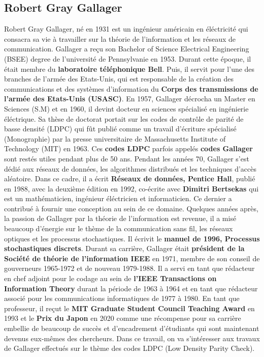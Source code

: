 \documentclass[french,nochapter,11pt]{rapportUB}
\begin{document}
\subsection{Robert Gray Gallager}
Robert Gray Gallager, né en 1931 est un ingénieur américain en éléctricité qui consacra sa vie à travailler sur la théorie de l'information et les réseaux de communication. \newline
Gallager a reçu son Bachelor of Science Electrical Engineering (BSEE) degree de l'université de Pennsylvanie en 1953. Durant cette époque, il était membre du \textbf{laboratoire téléphonique Bell}. Puis, il servit pour l'une des branches de l'armée des Etats-Unis, qui est responsable de la création des communications et des systèmes d'information du \textbf{Corps des transmissions de l'armée des Etats-Unis (USASC)}. En 1957, Gallager décrocha un Master en Sciences (S.M) et en 1960, il devint docteur en sciences spécialisé en ingénierie éléctrique. \newline
Sa thèse de doctorat portait sur les codes de contrôle de parité de basse densité (LDPC) qui fût publié comme un travail d'écriture spécialisé (Monographie) par la presse universitaire de Massachusetts Institute of Technology (MIT) en 1963. Ces \textbf{codes LDPC} parfois appelés \textbf{codes Gallager} sont restés utiles pendant plus de 50 ans. \newline
Pendant les années 70, Gallager s'est dédié aux réseaux de données, les algorithmes distribués et les techniques d'accès aléatoire. Dans ce cadre, il a écrit \textbf{Réseaux de données, Pentice Hall}, publié en 1988, avec la deuxième édition en 1992, co-écrite avec \textbf{Dimitri Bertsekas} qui est un mathématicien, ingénieur éléctricien et informaticien. Ce dernier a contribué à fournir une conception au sein de ce domaine. \newline
Quelques années après, la passion de Gallager par la théorie de l'information est revenue, il a misé beaucoup d'énergie sur le thème de la communication sans fil, les réseaux optiques et les processus stochastiques. Il écrivit le \textbf{manuel de 1996, Processus stochastiques discrets}.\newline
Durant sa carrière, Gallager était \textbf{président de la Société de théorie de l'information IEEE} en 1971, membre de son conseil de gouverneurs 1965-1972 et de nouveau 1979-1988. Il a servi en tant que rédacteur en chef adjoint pour le codage au sein de \textbf{l'IEEE Transactions on Information Theory} durant la période de 1963 à 1964 et en tant que rédacteur associé pour les communications informatiques de 1977 à 1980. \newline
En tant que professeur, il reçut le \textbf{MIT Graduate Student Council Teaching Award} en 1993 et le \textbf{Prix du Japon} en 2020 comme une récompense pour sa carrière embellie de beaucoup de succès et d'encadrement d'étudiants qui sont maintenant devenus eux-mêmes des chercheurs. \newline
Dans ce travail, on va s'intéresser aux travaux de Gallager effectués sur le thème des codes LDPC (Low Density Parity Check). \newline
\clearpage
\end{document}
